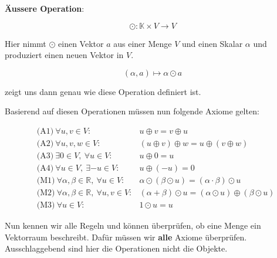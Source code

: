 \textbf{Äussere Operation}:

\begin{equation*}
    \odot: \mathbb{K} \times V \rightarrow V
\end{equation*}

Hier nimmt \( \odot \) einen Vektor \( a \) aus einer Menge \( V \) und einen Skalar \( \alpha \)  und produziert einen neuen Vektor in \( V \).

\begin{equation*}
    (\alpha, a) \mapsto \alpha \odot a
\end{equation*}

zeigt uns dann genau wie diese Operation definiert ist.

\vspace{1\baselineskip}

Basierend auf diesen Operationen müssen nun folgende Axiome gelten:

\begin{tcolorbox}[colback=gray!30, colframe=gray!80, title=Axiome für Vektorräume]
    \begin{equation*}
        \begin{aligned}
            &\text{(A1)} \ \forall u, v \in V: &u \oplus v = v \oplus u \\
            &\text{(A2)} \ \forall u, v, w \in V: &(u \oplus v) \oplus w = u \oplus (v \oplus w) \\
            &\text{(A3)} \ \exists 0 \in V, \ \forall u \in V: & u \oplus 0 = u \\
            &\text{(A4)} \ \forall u \in V, \ \exists -u \in V: & u \oplus (-u) = 0 \\
            &\text{(M1)} \ \forall \alpha, \beta \in \mathbb{R}, \ \forall u \in V: & \alpha \odot (\beta \odot u) = (\alpha \cdot \beta) \odot u \\
            &\text{(M2)} \ \forall \alpha, \beta \in \mathbb{R}, \ \forall u, v \in V: & (\alpha + \beta) \odot u = (\alpha \odot u) \oplus (\beta \odot u) \\
            &\text{(M3)} \ \forall u \in V: & 1 \odot u = u
        \end{aligned}
    \end{equation*}
\end{tcolorbox}

\vspace{1\baselineskip}

Nun kennen wir alle Regeln und können überprüfen, ob eine Menge ein Vektorraum beschreibt. Dafür müssen wir \textbf{alle} Axiome überprüfen. Ausschlaggebend sind hier die Operationen nicht die Objekte.

